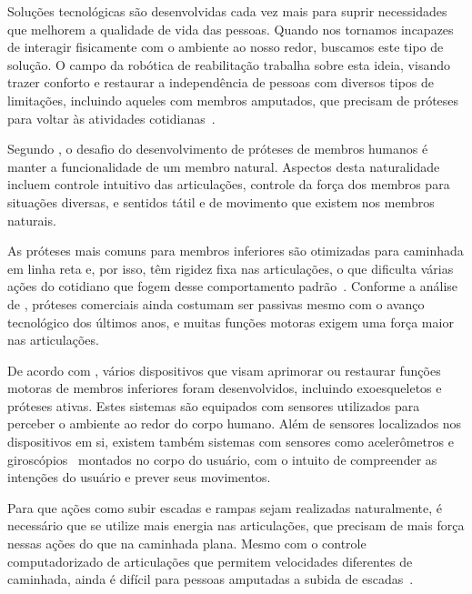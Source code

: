 Soluções tecnológicas são desenvolvidas cada vez mais para suprir necessidades que melhorem a qualidade de vida das pessoas. Quando nos tornamos incapazes de interagir fisicamente com o ambiente ao nosso redor, buscamos este tipo de solução. O campo da robótica de reabilitação trabalha sobre esta ideia, visando trazer conforto e restaurar a independência de pessoas com diversos tipos de limitações, incluindo aqueles com membros amputados, que precisam de próteses para voltar às atividades cotidianas~\cite{siciliano:2008springer}.

Segundo , o desafio do desenvolvimento de próteses de membros humanos é manter a funcionalidade de um membro natural. Aspectos desta naturalidade incluem controle intuitivo das articulações, controle da força dos membros para situações diversas, e sentidos tátil e de movimento que existem nos membros naturais.

As próteses mais comuns para membros inferiores são otimizadas para caminhada em linha reta e, por isso, têm rigidez fixa nas articulações, o que dificulta várias ações do cotidiano que fogem desse comportamento padrão~\cite{pew:2017}. Conforme a análise de , próteses comerciais ainda costumam ser passivas mesmo com o avanço tecnológico dos últimos anos, e muitas funções motoras exigem uma força maior nas articulações.

De acordo com , vários dispositivos que visam aprimorar ou restaurar funções motoras de membros inferiores foram desenvolvidos, incluindo exoesqueletos e próteses ativas. Estes sistemas são equipados com sensores utilizados para perceber o ambiente ao redor do corpo humano. Além de sensores localizados nos dispositivos em si, existem também sistemas com sensores como acelerômetros e giroscópios~\cite{invensense:imu_mpu} montados no corpo do usuário, com o intuito de compreender as intenções do usuário e prever seus movimentos.

Para que ações como subir escadas e rampas sejam realizadas naturalmente, é necessário que se utilize mais energia nas articulações, que precisam de mais força nessas ações do que na caminhada plana. Mesmo com o controle computadorizado de articulações que permitem velocidades diferentes de caminhada, ainda é difícil para pessoas amputadas a subida de escadas~\cite{dedic:2011}.

